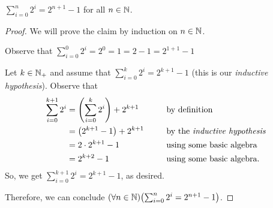 \begin{example}
    $\displaystyle \sum_{i = 0}^{n}2^i = 2^{n + 1} - 1$ for all $n \in \mathbb{N}$.
\end{example}
\begin{proof}
    We will prove the claim by induction on $n \in \mathbb{N}$.
    \begin{case}
        Observe that $\sum_{i = 0}^{0}2^i = 2^0 = 1 = 2 - 1 = 2^{1 + 1} - 1$
    \end{case}
    \begin{case}
        Let $k \in \mathbb{N}_+$ and assume that $\sum_{i = 0}^{k}2^i = 2^{k + 1} - 1$
        (this is our \emph{inductive hypothesis}).
        Observe that
        \begin{alignat*}{2}
            \sum_{i = 0}^{k + 1}2^i &= \pn*{\sum_{i = 0}^{k}2^i} + 2^{k + 1} &&\text{ by definition} \\
                                    &= \pn*{2^{k + 1} - 1} + 2^{k + 1}~~~~&&\text{ by the \emph{inductive hypothesis}} \\
                                    &= 2 \cdot 2^{k + 1} - 1 &&\text{ using some basic algebra} \\
                                    &= 2^{k + 2} - 1 &&\text{ using some basic algebra}.
        \end{alignat*}
        So, we get $\sum_{i = 0}^{k + 1}2^i = 2^{k + 1} - 1$, as desired.
    \end{case}
    Therefore, we can conclude $\pn*{\forall n \in \N}\pn*{\sum_{i = 0}^{n}2^i = 2^{n + 1} - 1}$.
\end{proof}

